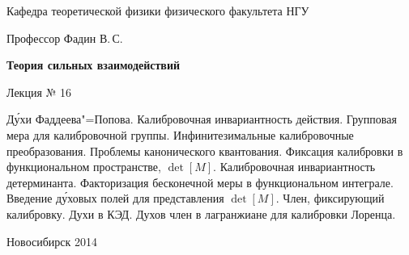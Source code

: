 \documentclass[12pt,pagesize,paper=landscape,paper=192mm:108mm]{scrbook}
\begin{document}
\begin{titlepage}
\begin{center}
    Кафедра теоретической физики физического факультета НГУ
    \medskip

    \Large
    Профессор Фадин В.\,С.

    \huge
    \textbf{Теория сильных взаимодействий}
    \smallskip
    
    \Large
    Лекция № 16
    \vfill
    
    \normalsize
    \begin{minipage}{0.77\linewidth}
      Д\'{у}хи Фаддеева"=Попова. Калибровочная инвариантность
      действия. Групповая мера для калибровочной
      группы. Инфинитезимальные калибровочные преобразования. Проблемы
      канонического квантования. Фиксация калибровки в функциональном
      пространстве, $\det[M]$. Калибровочная инвариантность
      детерминанта. Факторизация бесконечной меры в функциональном
      интеграле. Введение д\'{у}ховых полей для представления
      $\det[M]$. Член, фиксирующий калибровку. Духи в КЭД. Духов член
      в лагранжиане для калибровки Лоренца.
    \end{minipage}
    \vfill
    
    \normalsize \ccbysa\hspace{0.5em}  Новосибирск 2014   
  \end{center}
\end{titlepage}
\end{document}
